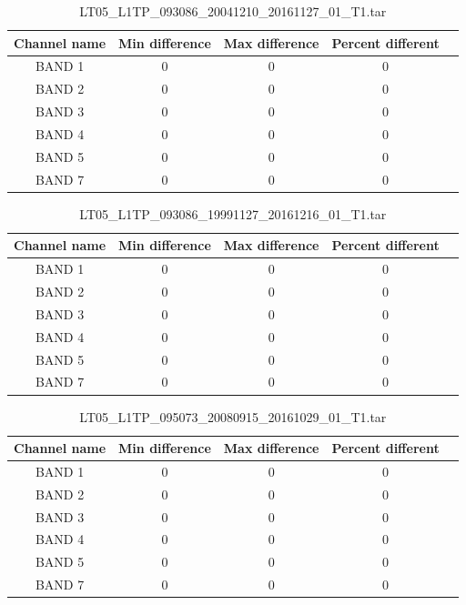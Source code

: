 \documentclass[a4paper]{article}
\begin{document}
    \begin{table}[ht!]
      \caption{LT05\_L1TP\_093086\_20041210\_20161127\_01\_T1.tar}\label{table:4}
      \centering
      \small
      \begin{tabular}{ccccc} \midrule
        \textbf{Channel name} & \textbf{Min difference} & \textbf{Max difference} & \textbf{Percent different} \\ \midrule
        BAND 1 & 0 & 0 & 0 \\
        BAND 2 & 0 & 0 & 0 \\
        BAND 3 & 0 & 0 & 0 \\
        BAND 4 & 0 & 0 & 0 \\
        BAND 5 & 0 & 0 & 0 \\
        BAND 7 & 0 & 0 & 0 \\ \midrule
      \end{tabular}
    \end{table}

    \begin{table}[ht!]
      \caption{LT05\_L1TP\_093086\_19991127\_20161216\_01\_T1.tar}\label{table:5}
      \centering
      \small
      \begin{tabular}{ccccc} \midrule
        \textbf{Channel name} & \textbf{Min difference} & \textbf{Max difference} & \textbf{Percent different} \\ \midrule
        BAND 1 & 0 & 0 & 0 \\
        BAND 2 & 0 & 0 & 0 \\
        BAND 3 & 0 & 0 & 0 \\
        BAND 4 & 0 & 0 & 0 \\
        BAND 5 & 0 & 0 & 0 \\
        BAND 7 & 0 & 0 & 0 \\ \midrule
      \end{tabular}
    \end{table}

    \begin{table}[ht!]
      \caption{LT05\_L1TP\_095073\_20080915\_20161029\_01\_T1.tar}\label{table:6}
      \centering
      \small
      \begin{tabular}{ccccc} \midrule
        \textbf{Channel name} & \textbf{Min difference} & \textbf{Max difference} & \textbf{Percent different} \\ \midrule
        BAND 1 & 0 & 0 & 0 \\
        BAND 2 & 0 & 0 & 0 \\
        BAND 3 & 0 & 0 & 0 \\
        BAND 4 & 0 & 0 & 0 \\
        BAND 5 & 0 & 0 & 0 \\
        BAND 7 & 0 & 0 & 0 \\ \midrule
      \end{tabular}
    \end{table}
\end{document}
